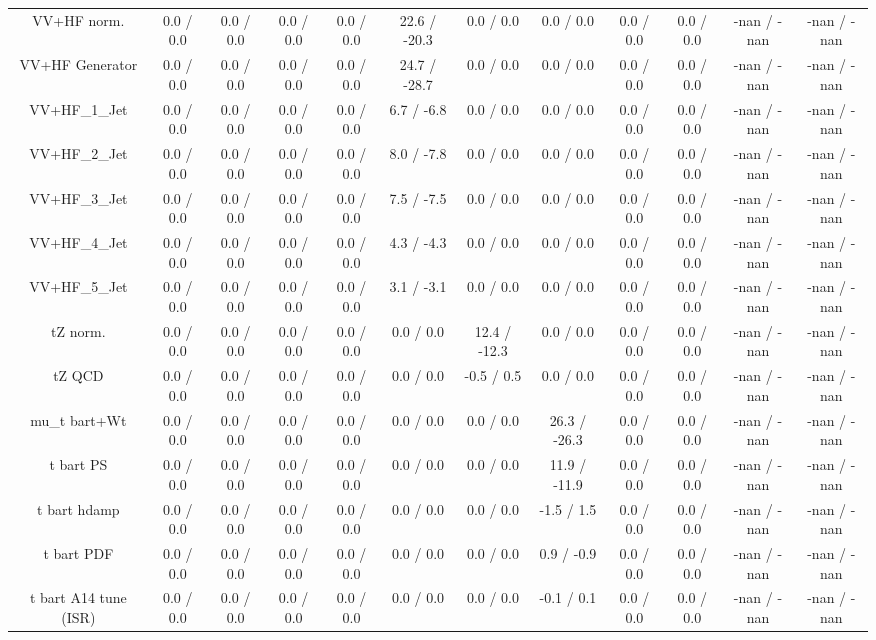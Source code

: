 \begin{table}[htbp]
\begin{center}
\begin{tabular}{|c|c|c|c|c|c|c|c|c|c|c|c|}
  VV+HF norm. & 0.0 / 0.0 & 0.0 / 0.0 & 0.0 / 0.0 & 0.0 / 0.0 & 22.6 / -20.3 & 0.0 / 0.0 & 0.0 / 0.0 & 0.0 / 0.0 & 0.0 / 0.0 & -nan / -nan & -nan / -nan \\ 
  VV+HF Generator & 0.0 / 0.0 & 0.0 / 0.0 & 0.0 / 0.0 & 0.0 / 0.0 & 24.7 / -28.7 & 0.0 / 0.0 & 0.0 / 0.0 & 0.0 / 0.0 & 0.0 / 0.0 & -nan / -nan & -nan / -nan \\ 
  VV+HF_1_Jet & 0.0 / 0.0 & 0.0 / 0.0 & 0.0 / 0.0 & 0.0 / 0.0 & 6.7 / -6.8 & 0.0 / 0.0 & 0.0 / 0.0 & 0.0 / 0.0 & 0.0 / 0.0 & -nan / -nan & -nan / -nan \\ 
  VV+HF_2_Jet & 0.0 / 0.0 & 0.0 / 0.0 & 0.0 / 0.0 & 0.0 / 0.0 & 8.0 / -7.8 & 0.0 / 0.0 & 0.0 / 0.0 & 0.0 / 0.0 & 0.0 / 0.0 & -nan / -nan & -nan / -nan \\ 
  VV+HF_3_Jet & 0.0 / 0.0 & 0.0 / 0.0 & 0.0 / 0.0 & 0.0 / 0.0 & 7.5 / -7.5 & 0.0 / 0.0 & 0.0 / 0.0 & 0.0 / 0.0 & 0.0 / 0.0 & -nan / -nan & -nan / -nan \\ 
  VV+HF_4_Jet & 0.0 / 0.0 & 0.0 / 0.0 & 0.0 / 0.0 & 0.0 / 0.0 & 4.3 / -4.3 & 0.0 / 0.0 & 0.0 / 0.0 & 0.0 / 0.0 & 0.0 / 0.0 & -nan / -nan & -nan / -nan \\ 
  VV+HF_5_Jet & 0.0 / 0.0 & 0.0 / 0.0 & 0.0 / 0.0 & 0.0 / 0.0 & 3.1 / -3.1 & 0.0 / 0.0 & 0.0 / 0.0 & 0.0 / 0.0 & 0.0 / 0.0 & -nan / -nan & -nan / -nan \\ 
  tZ norm. & 0.0 / 0.0 & 0.0 / 0.0 & 0.0 / 0.0 & 0.0 / 0.0 & 0.0 / 0.0 & 12.4 / -12.3 & 0.0 / 0.0 & 0.0 / 0.0 & 0.0 / 0.0 & -nan / -nan & -nan / -nan \\ 
  tZ QCD & 0.0 / 0.0 & 0.0 / 0.0 & 0.0 / 0.0 & 0.0 / 0.0 & 0.0 / 0.0 & -0.5 / 0.5 & 0.0 / 0.0 & 0.0 / 0.0 & 0.0 / 0.0 & -nan / -nan & -nan / -nan \\ 
   mu_{t bar{t}+Wt} & 0.0 / 0.0 & 0.0 / 0.0 & 0.0 / 0.0 & 0.0 / 0.0 & 0.0 / 0.0 & 0.0 / 0.0 & 26.3 / -26.3 & 0.0 / 0.0 & 0.0 / 0.0 & -nan / -nan & -nan / -nan \\ 
  t bar{t} PS & 0.0 / 0.0 & 0.0 / 0.0 & 0.0 / 0.0 & 0.0 / 0.0 & 0.0 / 0.0 & 0.0 / 0.0 & 11.9 / -11.9 & 0.0 / 0.0 & 0.0 / 0.0 & -nan / -nan & -nan / -nan \\ 
  t bar{t} hdamp & 0.0 / 0.0 & 0.0 / 0.0 & 0.0 / 0.0 & 0.0 / 0.0 & 0.0 / 0.0 & 0.0 / 0.0 & -1.5 / 1.5 & 0.0 / 0.0 & 0.0 / 0.0 & -nan / -nan & -nan / -nan \\ 
  t bar{t} PDF & 0.0 / 0.0 & 0.0 / 0.0 & 0.0 / 0.0 & 0.0 / 0.0 & 0.0 / 0.0 & 0.0 / 0.0 & 0.9 / -0.9 & 0.0 / 0.0 & 0.0 / 0.0 & -nan / -nan & -nan / -nan \\ 
  t bar{t} A14 tune (ISR) & 0.0 / 0.0 & 0.0 / 0.0 & 0.0 / 0.0 & 0.0 / 0.0 & 0.0 / 0.0 & 0.0 / 0.0 & -0.1 / 0.1 & 0.0 / 0.0 & 0.0 / 0.0 & -nan / -nan & -nan / -nan \\ 

\end{tabular}
\end{center}
\end{table}
